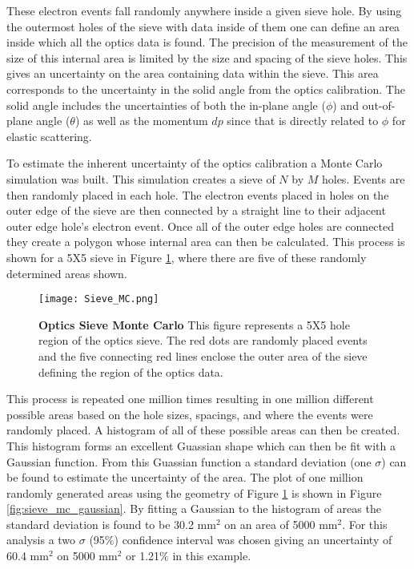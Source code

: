 These electron events fall randomly anywhere inside a given sieve hole. By using the outermost holes of the sieve with data inside of them one can define an area inside which all the optics data is found. The precision of the measurement of the size of this internal area is limited by the size and spacing of the sieve holes. This gives an uncertainty on the area containing data within the sieve. This area corresponds to the uncertainty in the solid angle from the optics calibration. The solid angle includes the uncertainties of both the in-plane angle ($\phi$) and out-of-plane angle ($\theta$) as well as the momentum $dp$ since that is directly related to $\phi$ for elastic scattering.  

To estimate the inherent uncertainty of the optics calibration a Monte Carlo simulation was built. This simulation creates a sieve of $N$ by $M$ holes. Events are then randomly placed in each hole. The electron events placed in holes on the outer edge of the sieve are then connected by a straight line to their adjacent outer edge hole's electron event. Once all of the outer edge holes are connected they create a polygon whose internal area can then be calculated. This process is shown for a 5X5 sieve in Figure \ref{fig:sieve_mc}, where there are five of these randomly determined areas shown. 

\begin{figure}[!ht]
\begin{center}
\texttt{[image: Sieve\_MC.png]}
\end{center}
\caption[Optics Sieve Monte Carlo]{
{\bf{Optics Sieve Monte Carlo}} This figure represents a 5X5 hole region of the optics sieve. The red dots are randomly placed events and the five connecting red lines enclose the outer area of the sieve defining the region of the optics data.}
\label{fig:sieve_mc}
\end{figure}

This process is repeated one million times resulting in one million different possible areas based on the hole sizes, spacings, and where the events were randomly placed. A histogram of all of these possible areas can then be created. This histogram forms an excellent Guassian shape which can then be fit with a Gaussian function. From this Guassian function a standard deviation (one $\sigma$) can be found to estimate the uncertainty of the area. The plot of one million randomly generated areas using the geometry of Figure \ref{fig:sieve_mc} is shown in Figure \ref{fig:sieve_mc_gaussian}. By fitting a Gaussian to the histogram of areas the standard deviation is found to be 30.2 mm$^2$ on an area of 5000 mm$^2$. For this analysis a two $\sigma$ (95$\%$) confidence interval was chosen giving an uncertainty of 60.4 mm$^2$ on 5000 mm$^2$ or 1.21$\%$ in this example. %

